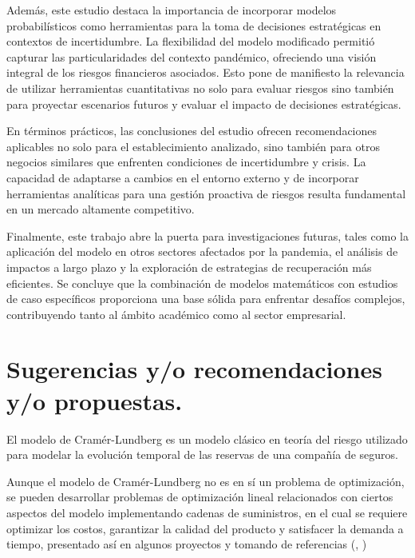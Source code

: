 \documentclass[
  us-letterpaper,
]{scrreprt}
\theoremstyle{plain}
\theoremstyle{plain}
\theoremstyle{definition}
\theoremstyle{remark}
\begin{document}
Además, este estudio destaca la importancia de incorporar modelos
probabilísticos como herramientas para la toma de decisiones
estratégicas en contextos de incertidumbre. La flexibilidad del modelo
modificado permitió capturar las particularidades del contexto
pandémico, ofreciendo una visión integral de los riesgos financieros
asociados. Esto pone de manifiesto la relevancia de utilizar
herramientas cuantitativas no solo para evaluar riesgos sino también
para proyectar escenarios futuros y evaluar el impacto de decisiones
estratégicas.

En términos prácticos, las conclusiones del estudio ofrecen
recomendaciones aplicables no solo para el establecimiento analizado,
sino también para otros negocios similares que enfrenten condiciones de
incertidumbre y crisis. La capacidad de adaptarse a cambios en el
entorno externo y de incorporar herramientas analíticas para una gestión
proactiva de riesgos resulta fundamental en un mercado altamente
competitivo.

Finalmente, este trabajo abre la puerta para investigaciones futuras,
tales como la aplicación del modelo en otros sectores afectados por la
pandemia, el análisis de impactos a largo plazo y la exploración de
estrategias de recuperación más eficientes. Se concluye que la
combinación de modelos matemáticos con estudios de caso específicos
proporciona una base sólida para enfrentar desafíos complejos,
contribuyendo tanto al ámbito académico como al sector empresarial.


\chapter{Sugerencias y/o recomendaciones y/o
propuestas.}\label{sugerencias-yo-recomendaciones-yo-propuestas.}

\label{text-align:justify}
El modelo de Cramér-Lundberg es un modelo clásico en teoría del riesgo
utilizado para modelar la evolución temporal de las reservas de una
compañía de seguros.

Aunque el modelo de Cramér-Lundberg no es en sí un problema de
optimización, se pueden desarrollar problemas de optimización lineal
relacionados con ciertos aspectos del modelo implementando cadenas de
suministros, en el cual se requiere optimizar los costos, garantizar la
calidad del producto y satisfacer la demanda a tiempo, presentado así en
algunos proyectos y tomando de referencias
(\textcite{martinez2021evaluacion}, \textcite{sanchez2021retos})
\end{document}
